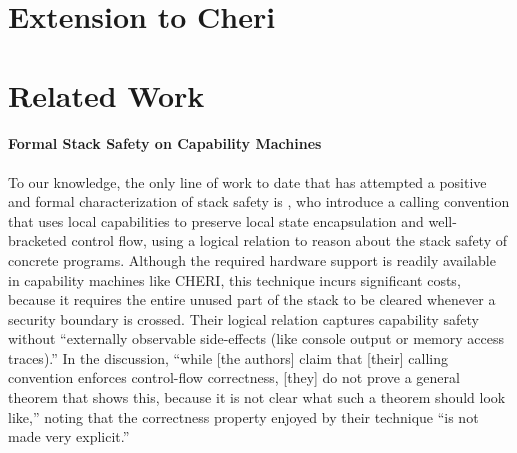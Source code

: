 \documentclass[acmsmall,review,anonymous]{acmart}\settopmatter{printfolios=true,printccs=false,printacmref=false}
\begin{document}
{\section{Extension to Cheri}


\section{Related Work}
\label{sec:relwork}


\paragraph{Formal Stack Safety on Capability Machines}
%
To our knowledge, the only line of work to date that has attempted
a positive and formal characterization of
stack safety is \citet{Skorstengaard+19b}, who introduce a calling
convention that uses local capabilities to preserve local state
encapsulation and well-bracketed control flow, using a logical
relation to reason about the stack safety of concrete
programs. Although the required hardware support is readily available
in capability machines like CHERI, this technique incurs significant
costs, because it requires the entire unused part of the stack to be
cleared whenever a security boundary is crossed. Their logical
relation captures capability safety without ``externally observable
side-effects (like console output or memory access traces).'' In the
discussion, ``while [the authors] claim that [their] calling
convention enforces control-flow correctness, [they] do not prove a
general theorem that shows this, because it is not clear what such a
theorem should look like,'' noting that the correctness property
enjoyed by their technique ``is not made very explicit.''

}
\end{document}
